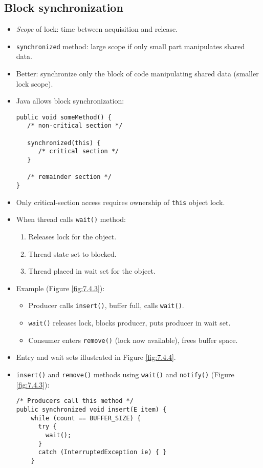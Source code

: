 \subsection{Block synchronization}
\begin{itemize}
    \item \textit{Scope} of lock: time between acquisition and release.
    \item \texttt{synchronized} method: large scope if only small part manipulates shared data.
    \item Better: synchronize only the block of code manipulating shared data (smaller lock scope).
    \item Java allows block synchronization:
    \begin{verbatim}
public void someMethod() {
   /* non-critical section */
 
   synchronized(this) {
      /* critical section */
   }
 
   /* remainder section */
}
    \end{verbatim}
    \item Only critical-section access requires ownership of \texttt{this} object lock.
    \item When thread calls \texttt{wait()} method:
    \begin{enumerate}
        \item Releases lock for the object.
        \item Thread state set to blocked.
        \item Thread placed in wait set for the object.
    \end{enumerate}
    \item Example (Figure \ref{fig:7.4.3}):
    \begin{itemize}
        \item Producer calls \texttt{insert()}, buffer full, calls \texttt{wait()}.
        \item \texttt{wait()} releases lock, blocks producer, puts producer in wait set.
        \item Consumer enters \texttt{remove()} (lock now available), frees buffer space.
    \end{itemize}
    \item Entry and wait sets illustrated in Figure \ref{fig:7.4.4}.
    \item \texttt{insert()} and \texttt{remove()} methods using \texttt{wait()} and \texttt{notify()} (Figure \ref{fig:7.4.3}):
    \begin{verbatim}
/* Producers call this method */
public synchronized void insert(E item) {
    while (count == BUFFER_SIZE) {
      try {
        wait();
      }
      catch (InterruptedException ie) { }
    }
 

\end{verbatim}
\end{itemize}
